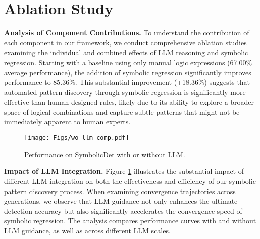 \clearpage
\setcounter{page}{1}
\maketitlesupplementary
% 
% 
\section{Ablation Study}
\noindent
\textbf{Analysis of Component Contributions.} To understand the contribution of each component in our framework, we conduct comprehensive ablation studies examining the individual and combined effects of LLM reasoning and symbolic regression. Starting with a baseline using only manual logic expressions (67.00\% average performance), the addition of symbolic regression significantly improves performance to 85.36\%. This substantial improvement (+18.36\%) suggests that automated pattern discovery through symbolic regression is significantly more effective than human-designed rules, likely due to its ability to explore a broader space of logical combinations and capture subtle patterns that might not be immediately apparent to human experts. \par
% 
% 
% 
\begin{figure}[!t]
    \centering
    \setlength{\abovecaptionskip}{0.1cm}
    \texttt{[image: Figs/wo\_llm\_comp.pdf]}
    \caption{Performance on SymbolicDet with or without LLM.}
    \label{fig:wo_llm}
    \vspace{-0.5cm}
\end{figure}
% 
% 
% 
\noindent
\textbf{Impact of LLM Integration.} Figure \ref{fig:wo_llm} illustrates the substantial impact of different LLM integration on both the effectiveness and efficiency of our symbolic pattern discovery process. When examining convergence trajectories across generations, we observe that LLM guidance not only enhances the ultimate detection accuracy but also significantly accelerates the convergence speed of symbolic regression. The analysis compares performance curves with and without LLM guidance, as well as across different LLM scales.
